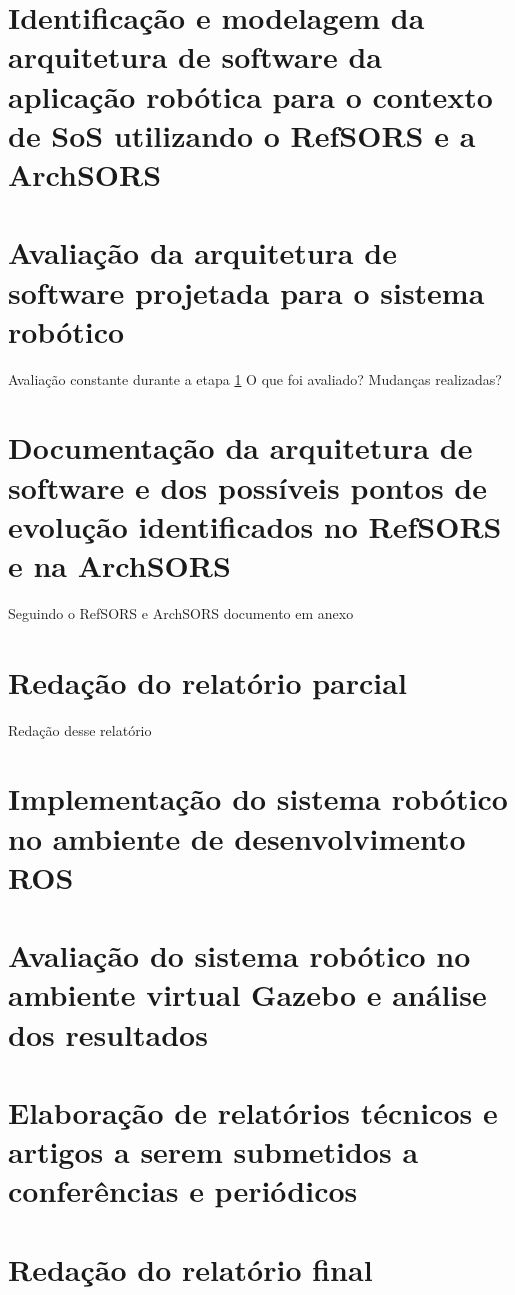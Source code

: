 \documentclass{article}
\begin{document}
\section{Identificação e modelagem da arquitetura de software da aplicação robótica para o contexto de SoS utilizando o RefSORS e a ArchSORS}\label{identificacao}

\section{Avaliação da arquitetura de software projetada para o sistema robótico}
Avaliação constante durante a etapa \ref{identificacao}
O que foi avaliado?
Mudanças realizadas?

\section{Documentação da arquitetura de software e dos possíveis pontos de evolução identificados no RefSORS e na ArchSORS}
Seguindo o RefSORS e ArchSORS
documento em anexo

\section{Redação do relatório parcial}
Redação desse relatório

\section{Implementação do sistema robótico no ambiente de desenvolvimento ROS}
\section{Avaliação do sistema robótico no ambiente virtual Gazebo e análise dos resultados}
\section{Elaboração de relatórios técnicos e artigos a serem submetidos a conferências e periódicos}
\section{Redação do relatório final}
\end{document}
